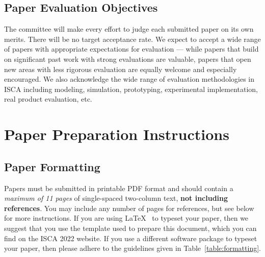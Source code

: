 \documentclass[conference]{IEEEtran}
\begin{document}
\subsection{Paper Evaluation Objectives}
The committee will make every effort to judge each submitted paper on
its own merits. There will be no target acceptance rate. We expect to
accept a wide range of papers with appropriate expectations for
evaluation --- while papers that build on significant past work with
strong evaluations are valuable, papers that open new areas with less
rigorous evaluation are equally welcome and especially encouraged. We
also acknowledge the wide range of evaluation methodologies in ISCA including
modeling, simulation, prototyping, experimental implementation, real
product evaluation, etc.

\section{Paper Preparation Instructions}

\subsection{Paper Formatting}
Papers must be submitted in printable PDF format and should contain a
{\em maximum of 11 pages} of single-spaced two-column text, {\bf not
  including references}.  You may include any number of pages for
references, but see below for more instructions.  If you are using
\LaTeX~\cite{lamport94} to typeset your paper, then we suggest that
you use the template used to prepare this document, which you can find
on the ISCA 2022 website. If you use a different
software package to typeset your paper, then please adhere to the
guidelines given in Table~\ref{table:formatting}.
\end{document}
